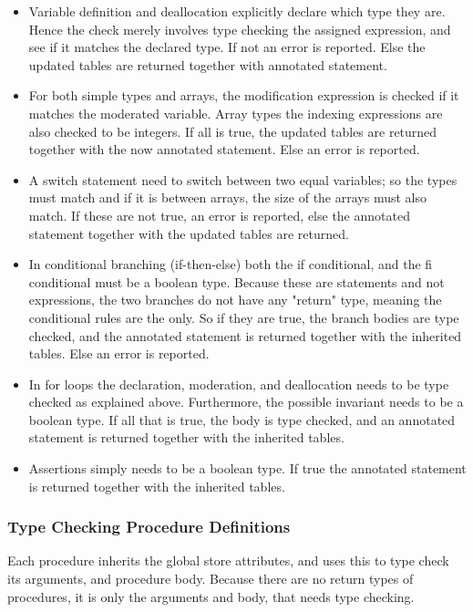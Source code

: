 \begin{itemize}
    \item Variable definition and deallocation explicitly declare which type they are. Hence
          the check merely involves type checking the assigned expression, and see if it matches
          the declared type. If not an error is reported. Else the updated tables are returned
          together with annotated statement.

    \item For both simple types and arrays, the modification expression is checked if it matches
          the moderated variable. Array types the indexing expressions are also checked
          to be integers. If all is true, the updated tables are returned together with
          the now annotated statement. Else an error is reported.      

    \item A switch statement need to switch between two equal variables; so the types must match
          and if it is between arrays, the size of the arrays must also match. If these are not
          true, an error is reported, else the annotated statement together with the updated
          tables are returned.

    \item In conditional branching (if-then-else) both the if conditional, and the fi conditional
          must be a boolean type. Because these are statements and not expressions, the two
          branches do not have any "return" type, meaning the conditional rules are the only.
          So if they are true, the branch bodies are type checked, and the annotated statement
          is returned together with the inherited tables. Else an error is reported.

    \item In for loops the declaration, moderation, and deallocation needs to be type checked
          as explained above. Furthermore, the possible invariant needs to be a boolean type.
          If all that is true, the body is type checked, and an annotated statement is returned
          together with the inherited tables.

    \item Assertions simply needs to be a boolean type. If true the annotated statement is returned
          together with the inherited tables.
\end{itemize}


\subsubsection{Type Checking Procedure Definitions}
Each procedure inherits the global store attributes, and uses this to type check its arguments,
and procedure body. Because there are no return types of procedures, it is only the arguments and
body, that needs type checking.

